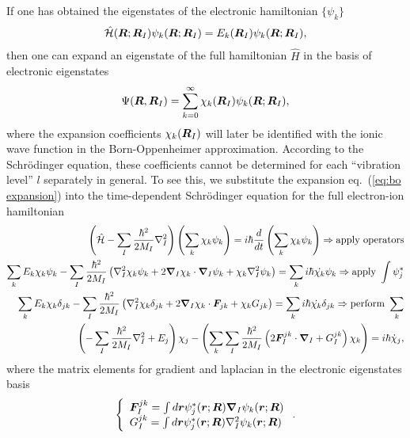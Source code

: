 If one has obtained the eigenstates of the electronic hamiltonian $\{\psi_k\}$
\begin{align}
\hat{\mathcal{H}} (\boldsymbol{R};\boldsymbol{R}_I) \psi_k(\boldsymbol{R};\boldsymbol{R}_I) = E_k(\boldsymbol{R}_I) \psi_k(\boldsymbol{R};\boldsymbol{R}_I),
\end{align}
then one can expand an eigenstate of the full hamiltonian $\hat{H}$ in the basis of electronic eigenstates
\begin{align} \label{eq:bo expansion}
\Psi(\boldsymbol{R},\boldsymbol{R}_I) = \sum_{k=0}^\infty \chi_k(\boldsymbol{R}_I)\psi_k(\boldsymbol{R};\boldsymbol{R}_I), 
\end{align}
where the expansion coefficients $\chi_k(\boldsymbol{R}_I)$ will later be identified with the ionic wave function in the Born-Oppenheimer approximation. According to the Schr\"odinger equation, these coefficients cannot be determined for each ``vibration level'' $l$ separately in general. To see this, we substitute the expansion eq.~(\ref{eq:bo expansion}) into the time-dependent Schr\"odinger equation for the full electron-ion hamiltonian
\begin{align}
\left(\hat{\mathcal{H}} - \sum_I\frac{\hbar^2}{2M_I}\nabla_I^2\right)\left(\sum_k\chi_k\psi_k\right) = i\hbar\frac{d}{dt}\left(\sum_k\chi_k\psi_k\right) \nonumber \Rightarrow \text{apply operators} \\
\sum_k E_k\chi_k\psi_k-\sum_I\frac{\hbar^2}{2M_I}\left(\nabla^2_I\chi_k\psi_k+2\boldsymbol{\nabla}_I\chi_k\cdot\boldsymbol{\nabla}_I\psi_k+\chi_k\nabla_I^2\psi_k\right) = \sum_k i\hbar\dot{\chi_k}\psi_k \nonumber \Rightarrow \text{apply }\int\psi_j^* \\
\sum_k E_k\chi_k\delta_{jk}-\sum_I\frac{\hbar^2}{2M_I}\left(\nabla^2_I\chi_k\delta_{jk}+2\boldsymbol{\nabla}_I\chi_k\cdot\boldsymbol{F}_{jk}+\chi_kG_{jk}\right) = \sum_k i\hbar\dot{\chi_k}\delta_{jk} \nonumber \Rightarrow \text{perform }\sum_k \\
\left(-\sum_I\frac{\hbar^2}{2M_I}\nabla^2_I+E_j\right)\chi_j - \left(\sum_k\sum_I \frac{\hbar^2}{2M_I}\left(2\boldsymbol{F}_I^{jk}\cdot\boldsymbol{\nabla}_I+G_I^{jk}\right)\chi_k\right) = i\hbar\dot{\chi}_j, \label{eq:coupled}
\end{align}
where the matrix elements for gradient and laplacian in the electronic eigenstates basis
\begin{align}
\left\{\begin{array}{l}
\boldsymbol{F}^{jk}_I = \int d\boldsymbol{r} \psi_j^*(\boldsymbol{r};\boldsymbol{R}) \boldsymbol{\nabla}_I\psi_k(\boldsymbol{r};\boldsymbol{R}) \\
G_I^{jk} = \int d\boldsymbol{r} \psi_j^*(\boldsymbol{r};\boldsymbol{R}) \nabla_I^2 \psi_k(\boldsymbol{r};\boldsymbol{R})
\end{array}\right..
\end{align}

